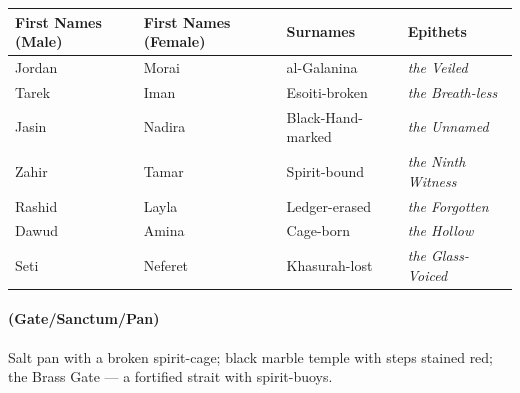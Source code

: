 \begin{longtable}{|p{}|p{}|p{}|p{}|}
\hline
\textbf{First Names (Male)} & \textbf{First Names (Female)} & \textbf{Surnames} & \textbf{Epithets} \\
\hline
Jordan & Morai & al-Galanina & \textit{the Veiled} \\
\hline
Tarek & Iman & Esoiti-broken & \textit{the Breath-less} \\
\hline
Jasin & Nadira & Black-Hand-marked & \textit{the Unnamed} \\
\hline
Zahir & Tamar & Spirit-bound & \textit{the Ninth Witness} \\
\hline
Rashid & Layla & Ledger-erased & \textit{the Forgotten} \\
\hline
Dawud & Amina & Cage-born & \textit{the Hollow} \\
\hline
Seti & Neferet & Khasurah-lost & \textit{the Glass-Voiced} \\
\hline
\end{longtable}

\paragraph*{(Gate/Sanctum/Pan)} Salt pan with a broken spirit-cage; black marble temple with steps stained red; the Brass Gate --- a fortified strait with spirit-buoys.

